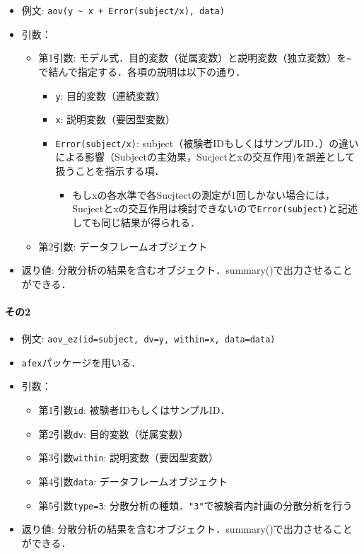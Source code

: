 \documentclass[
  xelatex, ja=standard]{bxjsarticle}
\providecommand{\tightlist}{%
  \setlength{\itemsep}{0pt}\setlength{\parskip}{0pt}}
\begin{document}
\begin{itemize}
\tightlist
\item
  例文:
  \texttt{aov(y\ \textasciitilde{}\ x\ +\ Error(subject/x),\ data)}
\item
  引数：

  \begin{itemize}
  \tightlist
  \item
    第1引数:
    モデル式．目的変数（従属変数）と説明変数（独立変数）を\texttt{\textasciitilde{}}で結んで指定する．各項の説明は以下の通り．

    \begin{itemize}
    \tightlist
    \item
      \texttt{y}: 目的変数（連続変数）
    \item
      \texttt{x}: 説明変数（要因型変数）
    \item
      \texttt{Error(subject/x)}:
      subject（被験者IDもしくはサンプルID．）の違いによる影響（Subjectの主効果，Sucjectとxの交互作用)を誤差として扱うことを指示する項．

      \begin{itemize}
      \tightlist
      \item
        もしxの各水準で各Sucjtectの測定が1回しかない場合には，Sucjectとxの交互作用は検討できないので\texttt{Error(subject)}と記述しても同じ結果が得られる．
      \end{itemize}
    \end{itemize}
  \item
    第2引数: データフレームオブジェクト
  \end{itemize}
\item
  返り値:
  分散分析の結果を含むオブジェクト．summary()で出力させることができる．
\end{itemize}

\paragraph{その2}\label{ux305dux306e2}

\begin{itemize}
\tightlist
\item
  例文: \texttt{aov\_ez(id=subject,\ dv=y,\ within=x,\ data=data)}
\item
  \texttt{afex}パッケージを用いる．
\item
  引数：

  \begin{itemize}
  \tightlist
  \item
    第1引数\texttt{id}: 被験者IDもしくはサンプルID．
  \item
    第2引数\texttt{dv}: 目的変数（従属変数）
  \item
    第3引数\texttt{within}: 説明変数（要因型変数）
  \item
    第4引数\texttt{data}: データフレームオブジェクト
  \item
    第5引数\texttt{type=3}:
    分散分析の種類．\texttt{"3"}で被験者内計画の分散分析を行う
  \end{itemize}
\item
  返り値:
  分散分析の結果を含むオブジェクト．summary()で出力させることができる．
\end{itemize}
\end{document}
